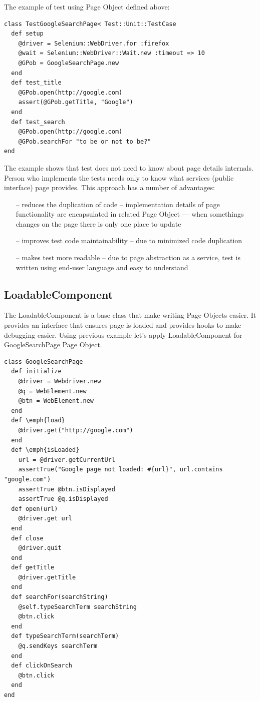 \documentclass[12pt,twoside]{article}
\begin{document}
The example of test using Page Object defined above:
\begin{verbatim}
class TestGoogleSearchPage< Test::Unit::TestCase
  def setup
    @driver = Selenium::WebDriver.for :firefox
    @wait = Selenium::WebDriver::Wait.new :timeout => 10
    @GPob = GoogleSearchPage.new
  end
  def test_title
    @GPob.open(http://google.com)
    assert(@GPob.getTitle, "Google")
  end
  def test_search
    @GPob.open(http://google.com)
    @GPob.searchFor "to be or not to be?"
end
\end{verbatim}
The example shows that test does not need to know about page details internals. Person who implements the tests needs only to know what services (public interface) page provides.
This approach has a number of advantages:
\begin{itemize}
\item [--] reduces the duplication of code -- implementation details of page functionality are encapsulated in related Page Object --- when somethings changes on the page there is only one place to update
\item [--] improves test code maintainability -- due to minimized code duplication
\item [--] makes test more readable -- due to page abstraction as a service, test is written using end-user language and easy to understand
\end{itemize}


\subsection{LoadableComponent}
The LoadableComponent is a base class that make writing Page Objects easier. It provides an interface that ensures page is loaded and provides hooks to make debugging easier. 
Using previous example let's apply LoadableComponent for GoogleSearchPage Page Object. 

\begin{verbatim}
class GoogleSearchPage
  def initialize
    @driver = Webdriver.new
    @q = WebElement.new
    @btn = WebElement.new
  end
  def \emph{load}
    @driver.get("http://google.com")
  end
  def \emph{isLoaded}
    url = @driver.getCurrentUrl
    assertTrue("Google page not loaded: #{url}", url.contains "google.com")  
    assertTrue @btn.isDisplayed
    assertTrue @q.isDisplayed
  def open(url)
    @driver.get url
  end
  def close
    @driver.quit
  end
  def getTitle
    @driver.getTitle
  end
  def searchFor(searchString)
    @self.typeSearchTerm searchString
    @btn.click
  end
  def typeSearchTerm(searchTerm)
    @q.sendKeys searchTerm
  end
  def clickOnSearch
    @btn.click
  end
end

\end{verbatim}
\end{document}
